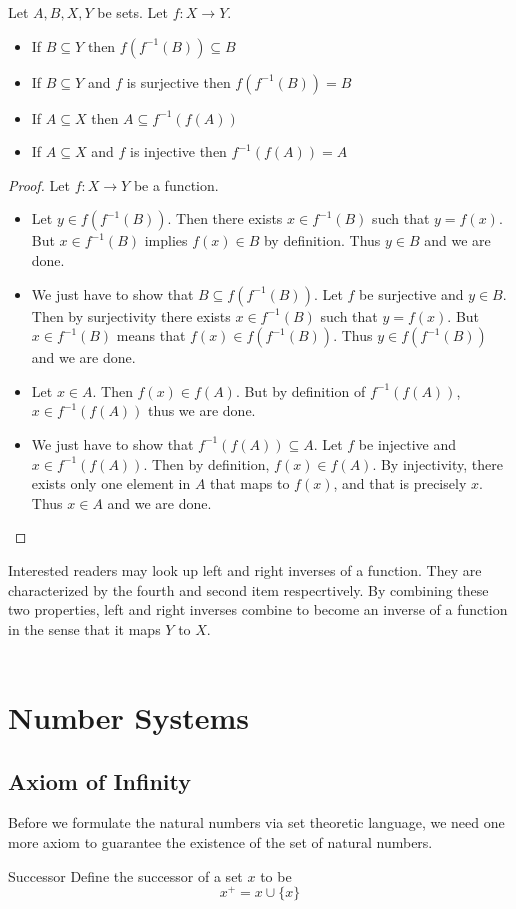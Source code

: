 \begin{prp}{}{} Let $A,B,X,Y$ be sets. Let $f:X\to Y$. 
\begin{itemize}
\item If $B\subseteq Y$ then $f(f^{-1}(B))\subseteq B$
\item If $B\subseteq Y$ and $f$ is surjective then $f(f^{-1}(B))=B$
\item If $A\subseteq X$ then $A\subseteq f^{-1}(f(A))$
\item If $A\subseteq X$ and $f$ is injective then $f^{-1}(f(A))=A$
\end{itemize} \tcbline
\begin{proof}
Let $f:X\to Y$ be a function. 
\begin{itemize}
\item Let $y\in f(f^{-1}(B))$. Then there exists $x\in f^{-1}(B)$ such that $y=f(x)$. But $x\in f^{-1}(B)$ implies $f(x)\in B$ by definition. Thus $y\in B$ and we are done. 
\item We just have to show that $B\subseteq f(f^{-1}(B))$. Let $f$ be surjective and $y\in B$. Then by surjectivity there exists $x\in f^{-1}(B)$ such that $y=f(x)$. But $x\in f^{-1}(B)$ means that $f(x)\in f(f^{-1}(B))$. Thus $y\in f(f^{-1}(B))$ and we are done. 
\item Let $x\in A$. Then $f(x)\in f(A)$. But by definition of $f^{-1}(f(A))$, $x\in f^{-1}(f(A))$ thus we are done. 
\item We just have to show that $f^{-1}(f(A))\subseteq A$. Let $f$ be injective and $x\in f^{-1}(f(A))$. Then by definition, $f(x)\in f(A)$. By injectivity, there exists only one element in $A$ that maps to $f(x)$, and that is precisely $x$. Thus $x\in A$ and we are done. 
\end{itemize}
\end{proof}
\end{prp}

Interested readers may look up left and right inverses of a function. They are characterized by the fourth and second item respecrtively. By combining these two properties, left and right inverses combine to become an inverse of a function in the sense that it maps $Y$ to $X$. \\~\\

\pagebreak

\section{Number Systems}
\subsection{Axiom of Infinity}
Before we formulate the natural numbers via set theoretic language, we need one more axiom to guarantee the existence of the set of natural numbers. 
\begin{defn}{Successor}{} Define the successor of a set $x$ to be $$x^+=x\cup\{x\}$$
\end{defn}

